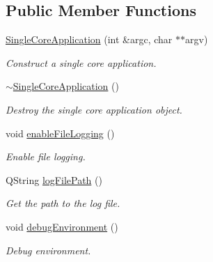 \subsection*{Public Member Functions}
\begin{DoxyCompactItemize}
\item 
\hyperlink{class_mdt_1_1_single_core_application_a18493beac6e321df7852571ed4a55205}{Single\+Core\+Application} (int \&argc, char $\ast$$\ast$argv)\hypertarget{class_mdt_1_1_single_core_application_a18493beac6e321df7852571ed4a55205}{}\label{class_mdt_1_1_single_core_application_a18493beac6e321df7852571ed4a55205}

\begin{DoxyCompactList}\small\item\em Construct a single core application. \end{DoxyCompactList}\item 
\hyperlink{class_mdt_1_1_single_core_application_ab3a61d6e1a5b36be02de6eba1c2f3867}{$\sim$\+Single\+Core\+Application} ()\hypertarget{class_mdt_1_1_single_core_application_ab3a61d6e1a5b36be02de6eba1c2f3867}{}\label{class_mdt_1_1_single_core_application_ab3a61d6e1a5b36be02de6eba1c2f3867}

\begin{DoxyCompactList}\small\item\em Destroy the single core application object. \end{DoxyCompactList}\item 
void \hyperlink{class_mdt_1_1_single_core_application_ae9084643bbbc67ce795dca5d6aae35fe}{enable\+File\+Logging} ()
\begin{DoxyCompactList}\small\item\em Enable file logging. \end{DoxyCompactList}\item 
Q\+String \hyperlink{class_mdt_1_1_single_core_application_a3f680ab0c6467712d7ba495e20adbafa}{log\+File\+Path} ()\hypertarget{class_mdt_1_1_single_core_application_a3f680ab0c6467712d7ba495e20adbafa}{}\label{class_mdt_1_1_single_core_application_a3f680ab0c6467712d7ba495e20adbafa}

\begin{DoxyCompactList}\small\item\em Get the path to the log file. \end{DoxyCompactList}\item 
void \hyperlink{class_mdt_1_1_single_core_application_a95e8cfb94a48a1c52e5896b74c78783f}{debug\+Environment} ()
\begin{DoxyCompactList}\small\item\em Debug environment. \end{DoxyCompactList}\end{DoxyCompactItemize}

